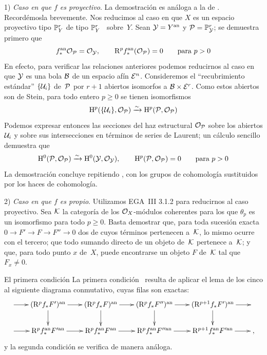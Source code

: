 1) \emph{Caso en que $f$ es proyectivo}. La demostración es análoga a la de
\cite[]{XII.10}. Recordémosla brevemente. Nos reducimos al caso en
que $X$ es un espacio proyectivo
{tipo $\PP^r_Y$}
{de tipo $\PP^r_Y$}%
~sobre~$Y$. Sean $\cal{Y}=Y^\an$ y $\cal{P}=\PP^r_\cal{Y}$; se demuestra
primero que
$$
f_*^\an \cal{O}_\cal{P} = \cal{O}_\cal{Y} \quoi, \qquad \R^p f_*^\an
(\cal{O}_\cal{P}) = 0 \qquad \text{para } p>0
$$
En efecto, para verificar las relaciones anteriores podemos reducirnos al
caso en que $\cal{Y}$ es una bola $\cal{B}$ de un espacio afín
$\cal{E}^n$. Consideremos el ``recubrimiento estándar'' $\{\cal{U}_i\}$
de~$\cal{P}$ por $r+1$ abiertos isomorfos a
$\cal{B}\times\cal{E}^r$. Como estos abiertos son de Stein, para todo
entero $p\geq0$ se tienen isomorfismos
$$
\H^p (\{ \cal{U}_i \}, \cal{O}_\cal{P}) \isomto \H^p (\cal{P},
\cal{O}_\cal{P})
$$
Podemos expresar entonces las secciones del haz estructural
$\cal{O}_\cal{P}$ sobre los abiertos $\cal{U}_i$ y sobre sus intersecciones
en términos de series de Laurent; un cálculo sencillo demuestra que
$$
\H^0 (\cal{P}, \cal{O}_\cal{P} ) \isomto \H^0 (\cal{Y},
\cal{O}_\cal{Y} ) \quoi, \qquad \H^p (\cal{P}, \cal{O}_\cal{P} ) = 0
\qquad \text{para } p>0
$$
La demostración concluye repitiendo \cite[ lema~5]{XII.10}, con los
grupos de cohomología sustituidos por los haces de cohomología.

2)
\emph{Caso en que $f$ es propio}. Utilizamos EGA~III 3.1.2 para reducirnos
al caso proyectivo. Sea $\cal{K}$ la categoría de los
$\cal{O}_X$-módulos coherentes para los que $\theta_p$ es un isomorfismo
para todo $p\geq0$. Basta demostrar que, para toda sucesión exacta
$0\to F'\to F\to F''\to0$ dos de cuyos términos pertenecen a~$\cal{K}$,
lo mismo ocurre con el tercero; que todo sumando directo de un objeto
de~$\cal{K}$ pertenece a~$\cal{K}$; y que, para todo punto $x$ de~$X$,
puede encontrarse un objeto $F$ de~$\cal{K}$ tal que $F_x\neq0$.

{El primera condición}
{La primera condición}%
~resulta de aplicar el lema de los cinco al siguiente diagrama conmutativo,
cuyas filas son exactas:
$$
\xymatrix@=.7cm{ \ar[r] & (\R^p f_* F')^\an \ar[d] \ar[r] &(\R^p f_*
F)^\an \ar[d] \ar[r] & (\R^p f_* F'')^\an \ar[d] \ar[r] &
(\R^{p+1} f_* F' )^\an \ar[r] \ar[d] &\, \\ \ar[r] & \R^p
f_*^\an F'^\an \ar[r] &\R^p f_*^\an F^\an \ar[r] & \R^p
f_*^\an F''^\an \ar[r] & \R^{p+1} f_*^\an F'^\an \ar[r] &
\quoi,}
$$
y la segunda condición se verifica de manera análoga.

